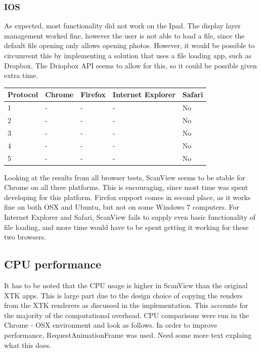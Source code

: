 \documentclass[a4paper,11pt,twoside]{article}
\begin{document}
\subsubsection*{IOS}

As expected, most functionality did not work on the Ipad. The display layer management worked fine, however the user is not able to load a file, since the default file opening only allows opening photos. However, it would be possible to circumvent this by implementing a solution that uses a file loading app, such as Dropbox. The Driopbox API seems to allow for this, so it could be possible given extra time.

\begin{center}

  \begin{tabular}{ | l || l | l | l | l |}
    \hline
    Protocol & Chrome & Firefox & Internet Explorer & Safari \\ \hline \hline
    1 & - & -  & -  & No \\ \hline
    2 & - & - & - & No \\ \hline
    3 & - & - & - & No \\ \hline
    4 & - & - & - & No \\ \hline
    5 & - & - & - & No \\
    \hline
  \end{tabular}

\end{center}

Looking at the results from all browser tests, ScanView seems to be stable for Chrome on all three platforms. This is encouraging, since most time was spent developing for this platform. Firefox support comes in second place, as it works fine on both OSX and Ubuntu, but not on some Windows 7 computers. For Internet Explorer and Safari, ScanView fails to supply even basic functionality of file loading, and more time would have to be spent getting it working for these two browsers.


\subsection{CPU performance}

It has to be noted that the CPU usage is higher in ScanView than the original XTK apps. This is large part due to the design choice of copying the renders from the XTK renderers as discussed in the implementation. This accounts for the majority of the computational overhead. CPU comparisons were run in the Chrome - OSX environment and look as follows.
In order to improve performance, RequestAnimationFrame was used. Need some more text explaing what this does.
\end{document}

